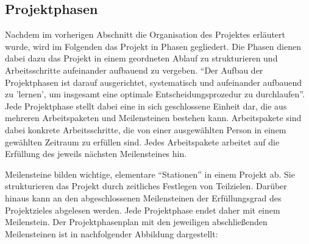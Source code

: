 \subsection{Projektphasen}
\label{sec:Projektphasen}

Nachdem im vorherigen Abschnitt die Organisation des Projektes erläutert wurde,
wird im Folgenden das Projekt in Phasen gegliedert. Die Phasen dienen dabei
dazu das Projekt in einem geordneten Ablauf zu strukturieren und
Arbeitsschritte aufeinander aufbauend zu vergeben. "`Der Aufbau der
Projektphasen ist darauf ausgerichtet, systematisch und aufeinander aufbauend
zu 'lernen', um insgesamt eine optimale Entscheidungsprozedur zu
durchlaufen"'.
Jede Projektphase stellt dabei eine in sich geschlossene Einheit dar, die aus
mehreren Arbeitspaketen und Meilensteinen bestehen kann. Arbeitspakete sind
dabei konkrete Arbeitsschritte, die von einer ausgewählten Person in einem
gewählten Zeitraum zu erfüllen sind. Jedes Arbeitspakete arbeitet auf die
Erfüllung des jeweils nächsten Meilensteines hin.

Meilensteine bilden wichtige, elementare "`Stationen"' in einem Projekt ab. Sie
strukturieren das Projekt durch zeitliches Festlegen von Teilzielen.
Darüber hinaus kann an den abgeschlossenen Meilensteinen
der Erfüllungsgrad des Projektzieles abgelesen werden.
Jede Projektphase endet daher mit einem Meilenstein. Der Projektphasenplan mit
den jeweiligen abschließenden Meilensteinen ist in nachfolgender Abbildung
dargestellt:


